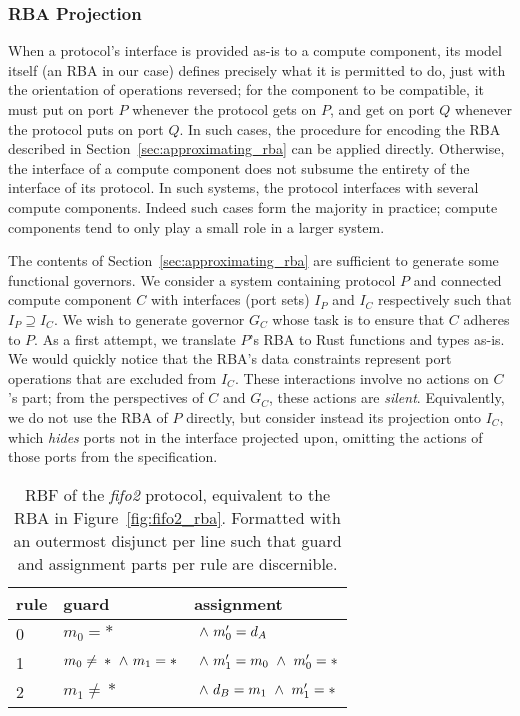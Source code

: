 \subsubsection{RBA Projection}
\label{sec:rba_projection}
When a protocol's interface is provided as-is to a compute component, its model itself (an RBA in our case) defines precisely what it is permitted to do, just with the orientation of operations reversed; for the component to be compatible, it must put on port $P$ whenever the protocol gets on $P$, and get on port $Q$ whenever the protocol puts on port $Q$. In such cases, the procedure for encoding the RBA described in Section~\ref{sec:approximating_rba} can be applied directly. Otherwise, the interface of a compute component does not subsume the entirety of the interface of its protocol. In such systems, the protocol interfaces with several compute components. Indeed such cases form the majority in practice; compute components tend to only play a small role in a larger system.

The contents of Section~\ref{sec:approximating_rba} are sufficient to generate some functional governors. We consider a system containing protocol $P$ and connected compute component $C$ with interfaces (port sets) $I_P$ and $I_C$ respectively such that $I_P \supseteq{} I_C$. We wish to generate governor $G_C$ whose task is to ensure that $C$ adheres to $P$. As a first attempt, we translate $P$'s RBA to Rust functions and types as-is. We would quickly notice that the RBA's data constraints represent port operations that are excluded from $I_C$. These interactions involve no actions on $C$'s part; from the perspectives of $C$ and $G_C$, these actions are \textit{silent}. Equivalently, we do not use the RBA of $P$ directly, but consider instead its projection onto $I_C$, which \textit{hides} ports not in the interface projected upon, omitting the actions of those ports from the specification. 


\begin{table}
	\centering
	\begin{tabular}{l|ll|}
		rule & guard & assignment \\
		\hline
		0 & $m_0=*$ & $\ \wedge{}\ {}m_0'=d_A$\\
		1 & $m_0\neq{}*\ \wedge{}\ {}m_1=*$ & $\ \wedge{}\ {}m_1'=m_0\ \wedge{}\ {}m_0'=*$ \\
		2 & $m_1\neq{}*$ & $\ \wedge{}\ {}d_B=m_1\ \wedge{}\ {}m_1'=*$ \\
		\hline
	\end{tabular}
	\caption[RBF for the fifo2 connector.]{RBF of the \textit{fifo2} protocol, equivalent to the RBA in Figure~\ref{fig:fifo2_rba}. Formatted with an outermost disjunct per line such that guard and assignment parts per rule are discernible.}
	\label{tab:fifo2_rbf_tsa}
\end{table}

